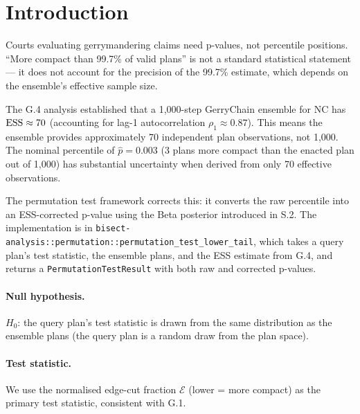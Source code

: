 \section{Introduction}

Courts evaluating gerrymandering claims need p-values, not percentile positions.
``More compact than 99.7\% of valid plans'' is not a standard statistical statement ---
it does not account for the precision of the 99.7\% estimate, which depends on
the ensemble's effective sample size.

The G.4 analysis established that a 1{,}000-step GerryChain ensemble for NC has
$\mathrm{ESS} \approx 70$ (accounting for lag-1 autocorrelation $\rho_1 \approx 0.87$).
This means the ensemble provides approximately 70 independent plan observations,
not 1{,}000.
The nominal percentile of $\hat{p} = 0.003$ (3 plans more compact than the enacted
plan out of 1{,}000) has substantial uncertainty when derived from only 70
effective observations.

The permutation test framework corrects this: it converts the raw percentile into
an ESS-corrected p-value using the Beta posterior introduced in S.2.
The implementation is in \texttt{bisect-analysis::permutation::permutation\_test\_lower\_tail},
which takes a query plan's test statistic, the ensemble plans, and the ESS estimate
from G.4, and returns a \texttt{PermutationTestResult} with both raw and corrected p-values.

\paragraph{Null hypothesis.}
$H_0$: the query plan's test statistic is drawn from the same distribution
as the ensemble plans (the query plan is a random draw from the plan space).

\paragraph{Test statistic.}
We use the normalised edge-cut fraction $\mathcal{E}$ (lower = more compact)
as the primary test statistic, consistent with G.1.
